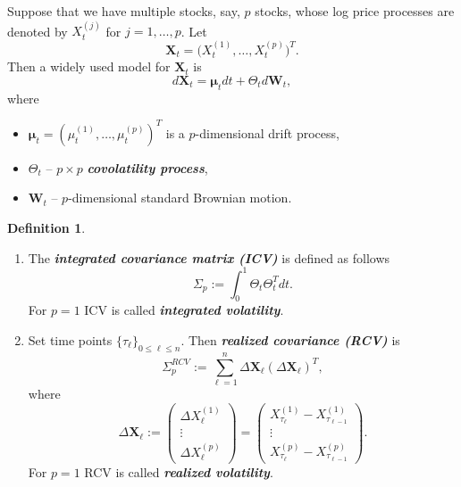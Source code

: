 \documentclass[a4paper,11pt]{article}
\theoremstyle{plain}
\theoremstyle{definition}
\newtheorem{defn}[thm]{Definition}
\newcommand{\define}[1]{\textit{\textbf{#1}}}
\begin{document}
    Suppose that we have multiple stocks, say, $p$ stocks, whose log price processes are denoted by $X_t^{(j)}$ for $j = 1, \dots, p$. Let
	\[ \mathbf{X}_t = \big(X_t^{(1)}, \dots, X_t^{(p)}\big)^T. \]
	Then a widely used model for $\mathbf{X}_t$ is
	\begin{equation} \label{X diffeq}
		d\mathbf{X}_t = \boldsymbol{\mu}_t dt + \Theta_td\mathbf{W}_t,
	\end{equation}
	where 
	\begin{itemize}
		\item $\boldsymbol{\mu}_t = (\mu_t^{(1)}, \dots, \mu_t^{(p)})^T$ is a $p$-dimensional drift process,
		\item $\Theta_t$ -- $p \times p$ \define{covolatility process},
		\item $\mathbf{W}_t$ -- $p$-dimensional standard Brownian motion.
	\end{itemize}


	\begin{defn} \
		\begin{enumerate}
			\item The \define{integrated covariance matrix (ICV)} is defined as follows
			\[\Sigma_p := \int_0^1\Theta_t \Theta_t^T dt.\]
			For $p=1$ ICV is called \define{integrated volatility}.
			\item Set time points $ \{\tau_\ell\}_{0 \leq \ell \leq n}$. Then \define{realized covariance (RCV)} is
			\begin{equation} \label{RCV}
				\Sigma_p^{RCV} := \sum_{\ell=1}^{n}\Delta \mathbf{X}_\ell(\Delta \mathbf{X}_\ell)^T,
			\end{equation}
			where 
			\[ \Delta \mathbf{X}_\ell :=
			\begin{pmatrix}
			\Delta X_\ell^{(1)} \\
			\vdots \\
			\Delta X_\ell^{(p)}
			\end{pmatrix}
			=
			\begin{pmatrix}
			X_{\tau_{\ell}}^{(1)} - X_{\tau_{\ell-1}}^{(1)} \\
			\vdots \\
			X_{\tau_{\ell}}^{(p)} - X_{\tau_{\ell-1}}^{(p)}
			\end{pmatrix}. \]
			For $p=1$ RCV is called \define{realized volatility}.
		\end{enumerate}
	\end{defn}
	
\end{document}
